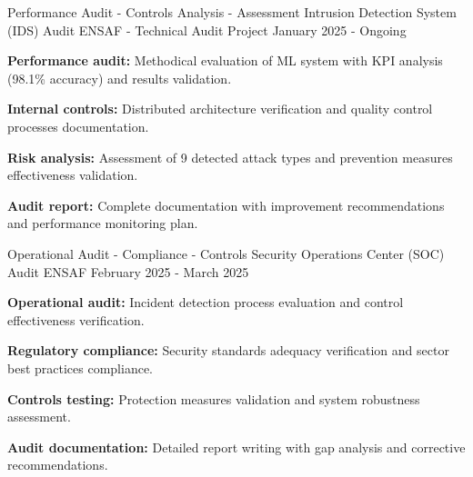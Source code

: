 
\begin{cventries}

    \cventry
    {Performance Audit - Controls Analysis - Assessment}
    {Intrusion Detection System (IDS) Audit} %
    {ENSAF - Technical Audit Project} %
    {January 2025 - Ongoing} %
    {
        \begin{cvitems} %
            \item {
                        \textbf{Performance audit:}
                        Methodical evaluation of ML system with KPI analysis (98.1\% accuracy) and results validation.}
            \item {
                        \textbf{Internal controls:}
                        Distributed architecture verification and quality control processes documentation.}
            \item {
                        \textbf{Risk analysis:}
                        Assessment of 9 detected attack types and prevention measures effectiveness validation.}
            \item {
                        \textbf{Audit report:}
                        Complete documentation with improvement recommendations and performance monitoring plan.}
        \end{cvitems}
    }

    \cventry
    {Operational Audit - Compliance - Controls}
    {Security Operations Center (SOC) Audit} %
    {ENSAF} %
    {February 2025 - March 2025} %
    {
        \begin{cvitems} %
            \item {
                        \textbf{Operational audit:}
                        Incident detection process evaluation and control effectiveness verification.}
            \item {
                        \textbf{Regulatory compliance:}
                        Security standards adequacy verification and sector best practices compliance.}
            \item {
                        \textbf{Controls testing:}
                        Protection measures validation and system robustness assessment.}
            \item {
                        \textbf{Audit documentation:}
                        Detailed report writing with gap analysis and corrective recommendations.}
        \end{cvitems}
    }

\end{cventries}